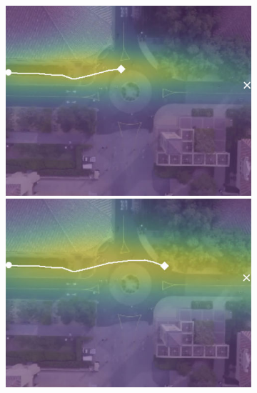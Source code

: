 \documentclass[usenames,dvipsnames]{article}
\begin{document}
\begin{enumerate}
\begin{item}
\begin{figure}[t!]
\begin{subfigure}[t]{0.5\textwidth}
\begin{minipage}[c]{0.3\linewidth}
	\end{minipage}
	\begin{minipage}[c]{0.3\linewidth}
		\includegraphics[width=\linewidth]{./figures/comparison/ours_death_1_2_t=250.jpg}
	\end{minipage}
	\begin{minipage}[c]{0.3\linewidth}
		\includegraphics[width=\linewidth]{./figures/comparison/ours_death_1_2_t=370.jpg}
	\end{minipage}
	

\end{subfigure}
\end{figure}
\end{item}
\end{enumerate}
\end{document}
